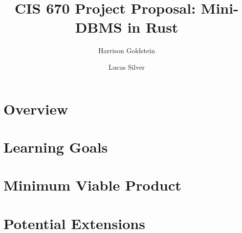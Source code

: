 \documentclass[acmsmall, nonacm, screen]{acmart}
\title{CIS 670 Project Proposal: Mini-DBMS in Rust}
\author{Harrison Goldstein}
\author{Lucas Silver}
\begin{document}
\maketitle

\section{Overview}

\section{Learning Goals}

\section{Minimum Viable Product}

\section{Potential Extensions}
\end{document}
